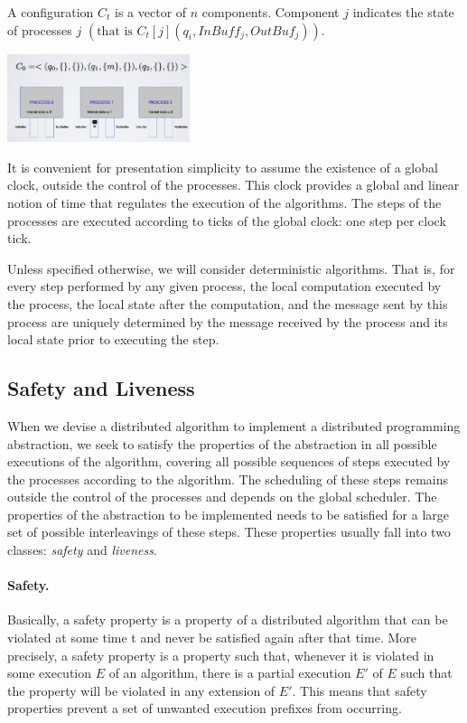 \documentclass{book}
\begin{document}
A configuration $C_t$ is a vector of $n$ components. 
Component $j$ indicates the state of processes $j$ $\left(\text{that is } C_t[j] \left(q_i,InBuff_j,OutBuf_j\right)\right)$.

\begin{center}
    \includegraphics[width=0.4\textwidth]{Immagini/5.png}
\end{center}

It is convenient for presentation simplicity to assume the existence of a global clock, outside the control of the processes.
This clock provides a global and linear notion of time that regulates the execution of the algorithms. 
The steps of the processes are executed according to ticks of the global clock: one step per clock tick.

Unless specified otherwise, we will consider deterministic algorithms. 
That is, for every step performed by any given process, the local computation executed by the process, the local state after the computation, and the message sent by this process are uniquely determined by the message received by the process and its local state prior to executing the step.


\subsection{Safety and Liveness}
When we devise a distributed algorithm to implement a distributed programming abstraction, we seek to satisfy the properties of the abstraction in all possible executions of the algorithm, covering all possible sequences of steps executed by the processes according to the algorithm.
The scheduling of these steps remains outside the control of the processes and depends on the global scheduler.
The properties of the abstraction to be implemented needs to be satisfied for a large set of possible interleavings of these steps.
These properties usually fall into two classes: \textit{safety} and \textit{liveness}.

\paragraph{Safety.}
Basically, a safety property is a property of a distributed algorithm that can be violated at some time t and never be satisfied again after that time.
\newline
More precisely, a safety property is a property such that, whenever it is violated in some execution $E$ of an algorithm, there is a partial execution $E'$ of $E$ such that the property will be violated in any extension of $E'$.
This means that safety properties prevent a set of unwanted execution prefixes from occurring.
\end{document}
